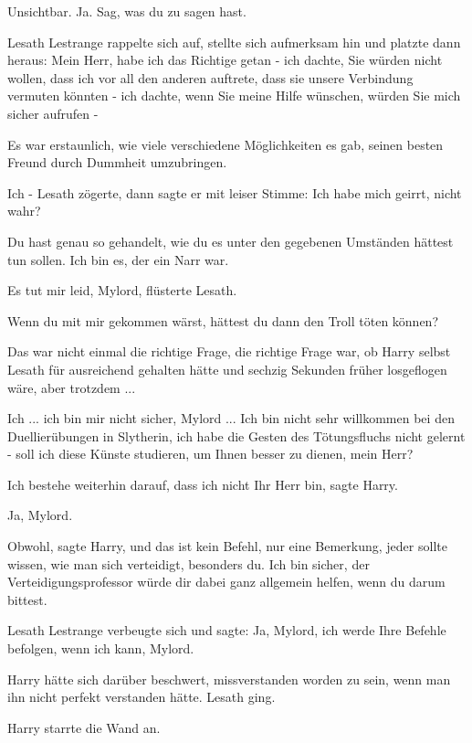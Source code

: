 \glqq{}Unsichtbar. Ja. Sag, was du zu sagen hast.\grqq{}

Lesath Lestrange rappelte sich auf, stellte sich aufmerksam hin und platzte dann
heraus: \glqq{}Mein Herr, habe ich das Richtige getan - ich dachte, Sie würden
nicht wollen, dass ich vor all den anderen auftrete, dass sie unsere Verbindung
vermuten könnten - ich dachte, wenn Sie meine Hilfe wünschen, würden Sie mich
sicher aufrufen -\grqq{}

Es war erstaunlich, wie viele verschiedene Möglichkeiten es gab, seinen besten
Freund durch Dummheit umzubringen.

\glqq{}Ich -\grqq{} Lesath zögerte, dann sagte er mit leiser Stimme: \glqq{}Ich
habe mich geirrt, nicht wahr?\grqq{}

\glqq{}Du hast genau so gehandelt, wie du es unter den gegebenen Umständen
hättest tun sollen. Ich bin es, der ein Narr war.\grqq{}

\glqq{}Es tut mir leid, Mylord\grqq{}, flüsterte Lesath.

\glqq{}Wenn du mit mir gekommen wärst, hättest du dann den Troll töten
können?\grqq{}

Das war nicht einmal die richtige Frage, die richtige Frage war, ob Harry selbst
Lesath für ausreichend gehalten hätte und sechzig Sekunden früher losgeflogen
wäre, aber trotzdem ...

\glqq{}Ich ... ich bin mir nicht sicher, Mylord ... Ich bin nicht sehr willkommen
bei den Duellierübungen in Slytherin, ich habe die Gesten des Tötungsfluchs
nicht gelernt - soll ich diese Künste studieren, um Ihnen besser zu dienen, mein
Herr?\grqq{}

\glqq{}Ich bestehe weiterhin darauf, dass ich nicht Ihr Herr bin\grqq{}, sagte
Harry.

\glqq{}Ja, Mylord.\grqq{}

\glqq{}Obwohl\grqq{}, sagte Harry, \glqq{}und das ist kein Befehl, nur eine
Bemerkung, jeder sollte wissen, wie man sich verteidigt, besonders du. Ich bin
sicher, der Verteidigungsprofessor würde dir dabei ganz allgemein helfen, wenn
du darum bittest.\grqq{}

Lesath Lestrange verbeugte sich und sagte: \glqq{}Ja, Mylord, ich werde Ihre
Befehle befolgen, wenn ich kann, Mylord.\grqq{}

Harry hätte sich darüber beschwert, missverstanden worden zu sein, wenn man ihn
nicht perfekt verstanden hätte. Lesath ging.

Harry starrte die Wand an.

